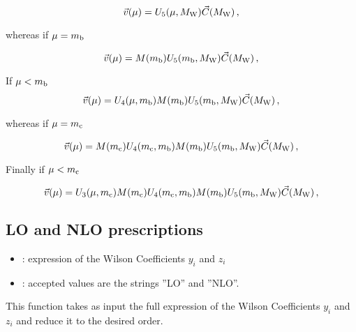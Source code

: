 \begin{equation}
\vec{v}(\mu) =
U_5(\mu,M_{\mathrm W}) \vec{C}(M_{\mathrm W}) \, ,
\label{eq:WCv}
\end{equation}

whereas if $\mu=m_{\mathrm b}$

\begin{equation}
\vec{v}(\mu) =
M(m_{\mathrm b}) U_5(m_{\mathrm b},M_{\mathrm W}) \vec{C}(M_{\mathrm W}) \, ,
\label{eq:WCv}
\end{equation}

If $\mu<m_{\mathrm b}$
\begin{equation}
\vec{v}(\mu) =
U_4(\mu,m_{\mathrm b}) M(m_{\mathrm b}) U_5(m_{\mathrm b},M_{\mathrm W}) \vec{C}(M_{\mathrm W}) \, ,
\label{eq:WCv}
\end{equation}

whereas if $\mu=m_{\mathrm c}$

\begin{equation}
\vec{v}(\mu) =
M(m_{\mathrm c}) U_4(m_{\mathrm c},m_{\mathrm b}) M(m_{\mathrm b}) U_5(m_{\mathrm b},M_{\mathrm W}) \vec{C}(M_{\mathrm W}) \, ,
\label{eq:WCv}
\end{equation}

Finally if $\mu<m_{\mathrm c}$

\begin{equation}
\vec{v}(\mu) =
U_3(\mu,m_{\mathrm c}) M(m_{\mathrm c}) U_4(m_{\mathrm c},m_{\mathrm b}) M(m_{\mathrm b}) U_5(m_{\mathrm b},M_{\mathrm W})
\vec{C}(M_{\mathrm W}) \, ,
\label{eq:WCv}
\end{equation}

\subsection{LO and NLO prescriptions}


\begin{itemize}
\item {}: expression of the Wilson Coefficients $y_i$ and $z_i$
\item {}: accepted values are the strings ''LO'' and ''NLO''.
\end{itemize}

This function takes as input the full expression of the Wilson Coefficients 
$y_i$ and $z_i$ and reduce it to the desired order.

